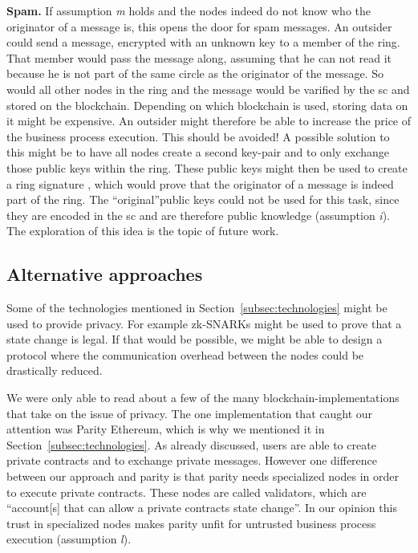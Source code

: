\documentclass[runningheads]{llncs}
\newcommand{\ber}[1]{\textit{#1}}
\newcommand{\refsec}[1]{Section~\ref{#1}}
\renewcommand{\bigbreak}{}
\newcommand{\quotel}{``}
\newcommand{\quoter}{''}
\begin{document}
\bigbreak
\textbf{Spam.} If assumption \ber{m} holds and the nodes indeed do not know who the originator of a message is, this opens the door for spam messages. An outsider could send a message, encrypted with an unknown key to a member of the ring. That member would pass the message along, assuming that he can not read it because he is not part of the same circle as the originator of the message. So would all other nodes in the ring and the message would be varified by the sc and stored on the blockchain. Depending on which blockchain is used, storing data on it might be expensive. An outsider might therefore be able to increase the price of the business process execution. This should be avoided! A possible solution to this might be to have all nodes create a second key-pair and to only exchange those public keys within the ring. These public keys might then be used to create a ring signature \cite{rivest2001leak}, which would prove that the originator of a message is indeed part of the ring. The \quotel original\quoter  public keys could not be used for this task, since they are encoded in the sc and are therefore public knowledge (assumption \ber{i}). The exploration of this idea is the topic of future work.





\subsection{Alternative approaches}

Some of the technologies mentioned in \refsec{subsec:technologies} might be used to provide privacy. For example zk-SNARKs might be used to prove that a state change is legal. If that would be possible, we might be able to design a protocol where the communication overhead between the nodes could be drastically reduced. 


We were only able to read about a few of the many blockchain-implementations that take on the issue of privacy. The one implementation that caught our attention was Parity Ethereum, which is why we mentioned it in \refsec{subsec:technologies}. As already discussed, users are able to create private contracts and to exchange private messages. However one difference between our approach and parity is that parity needs specialized nodes in order to execute private contracts. These nodes are called validators, which are \quotel account[s] that can allow a private contracts state change\quoter  \cite{parity}. In our opinion this trust in specialized nodes makes parity unfit for untrusted business process execution (assumption \ber{l}).
\end{document}
